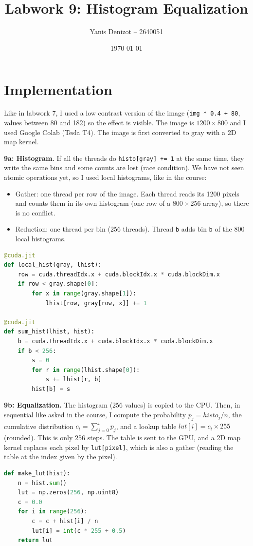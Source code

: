 \documentclass[11pt,a4paper]{article}
\title{Labwork 9: Histogram Equalization}
\author{Yanis Denizot -- 2640051}
\date{\today}
\begin{document}
\maketitle

\section{Implementation}
Like in labwork 7, I used a low contrast version of the image (\texttt{img * 0.4 + 80}, values
between 80 and 182) so the effect is visible. The image is $1200 \times 800$ and I used Google
Colab (Tesla T4). The image is first converted to gray with a 2D map kernel.

\textbf{9a: Histogram.} If all the threads do \texttt{histo[gray] += 1} at the same time, they
write the same bins and some counts are lost (race condition). We have not seen atomic
operations yet, so I used local histograms, like in the course:
\begin{itemize}
  \item Gather: one thread per row of the image. Each thread reads its 1200 pixels and counts
        them in its own histogram (one row of a $800 \times 256$ array), so there is no conflict.
  \item Reduction: one thread per bin (256 threads). Thread \texttt{b} adds bin \texttt{b} of
        the 800 local histograms.
\end{itemize}
\begin{lstlisting}[language=Python]
@cuda.jit
def local_hist(gray, lhist):
    row = cuda.threadIdx.x + cuda.blockIdx.x * cuda.blockDim.x
    if row < gray.shape[0]:
        for x in range(gray.shape[1]):
            lhist[row, gray[row, x]] += 1

@cuda.jit
def sum_hist(lhist, hist):
    b = cuda.threadIdx.x + cuda.blockIdx.x * cuda.blockDim.x
    if b < 256:
        s = 0
        for r in range(lhist.shape[0]):
            s += lhist[r, b]
        hist[b] = s
\end{lstlisting}

\textbf{9b: Equalization.} The histogram (256 values) is copied to the CPU. Then, in sequential
like asked in the course, I compute the probability $p_j = histo_j / n$, the cumulative
distribution $c_i = \sum_{j=0}^{i} p_j$, and a lookup table $lut[i] = c_i \times 255$ (rounded).
This is only 256 steps. The table is sent to the GPU, and a 2D map kernel replaces each pixel by
\texttt{lut[pixel]}, which is also a gather (reading the table at the index given by the pixel).
\begin{lstlisting}[language=Python]
def make_lut(hist):
    n = hist.sum()
    lut = np.zeros(256, np.uint8)
    c = 0.0
    for i in range(256):
        c = c + hist[i] / n
        lut[i] = int(c * 255 + 0.5)
    return lut
\end{lstlisting}
\end{document}
